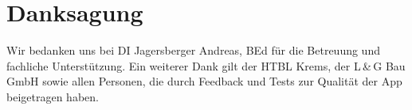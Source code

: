 \section{Danksagung}
Wir bedanken uns bei DI Jagersberger Andreas, BEd für die Betreuung und
fachliche Unterstützung. Ein weiterer Dank gilt der HTBL Krems, der L\,\&\,G Bau GmbH
sowie allen Personen, die durch Feedback und Tests zur Qualität der App beigetragen haben.